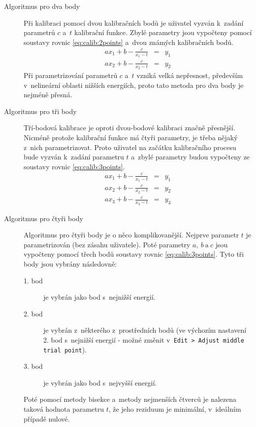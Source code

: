 \begin{description}
	\item[Algoritmus pro dva body]
	Při kalibraci pomocí dvou kalibračních bodů je uživatel vyzván k~zadání parametrů $c$ a~$t$ kalibrační funkce. Zbylé parametry jsou vypočteny pomocí soustavy rovnic \ref{eq:calib:2points} a~dvou známých kalibračních bodů.
	\begin{eqnarray}\label{eq:calib:2points}
		ax_{1} + b - \frac{c}{x_{1}-t} &=& y_{1} \\
		ax_{2} + b - \frac{c}{x_{2}-t} &=& y_{2} \nonumber 
	\end{eqnarray}
	Při parametrizování parametrů $c$ a~$t$ vzniká velká nepřesnost, především v~nelineární oblasti nižších energiích, proto tato metoda pro dva body je nejméně přesná.

	\item[Algoritmus pro tři body]
	Tří-bodová kalibrace je oproti dvou-bodové kalibraci značně přesnější. Nicméně protože kalibrační funkce má čtyři parametry, je třeba nějaký z~nich parametrizovat. Proto uživatel na začátku kalibračního procesu bude vyzván k~zadání parametru $t$ a~zbylé parametry budou vypočteny ze soustavy rovnic \ref{eq:calib:3points}.
	\begin{eqnarray}\label{eq:calib:3points}
		ax_{1} + b - \frac{c}{x_{1}-t} &=& y_{1} \nonumber \\
		ax_{2} + b - \frac{c}{x_{2}-t} &=& y_{2} \\
		ax_{3} + b - \frac{c}{x_{3}-t} &=& y_{3}\nonumber 
	\end{eqnarray}

	\item[Algoritmus pro čtyři body]
	Algoritmus pro čtyři body je o něco komplikovanější. Nejprve parametr $t$ je parametrizován (bez zásahu uživatele). Poté parametry $a,~b~\text{a}~c$ jsou vypočteny pomocí třech bodů soustavy rovnic \ref{eq:calib:3points}. Tyto tři body jsou vybrány následovně:
	\begin{description}
		\item[1. bod] je vybrán jako bod s~nejnižší energií.
		\item[2. bod] je vybrán z~některého z~prostředních bodů (ve výchozím nastavení 2. bod s~nejnižší energií - možné změnit v~\texttt{Edit > Adjust middle trial point}).
		\item[3. bod] je vybrán jako bod s~nejvyšší energií.
	\end{description}

	Poté pomocí metody bisekce a~metody nejmenších čtverců je nalezena taková hodnota parametru $t$, že jeho reziduum je minimální, v~ideálním případě nulové.


\end{description}
